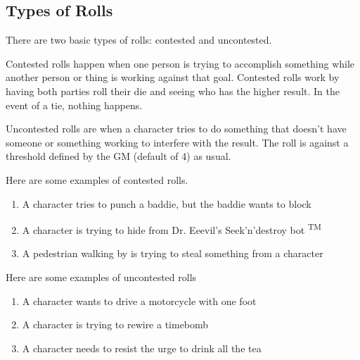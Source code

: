 \begin{flushleft}
\section*{Types of Rolls}

There are two basic types of rolls: contested and uncontested.

Contested rolls happen when one person is trying to accomplish something while
another person or thing is working against that goal. Contested rolls work by
having both parties roll their die and seeing who has the higher result. In
the event of a tie, nothing happens.

Uncontested rolls are when a character tries to do something that doesn't have
someone or something working to interfere with the result. The roll is against
a threshold defined by the GM (default of 4) as usual.

Here are some examples of contested rolls.

\begin{enumerate}

    \item{A character tries to punch a baddie, but the baddie wants to block}
    \item{A character is trying to hide from Dr. Eeevil's Seek'n'destroy bot
          \textsuperscript{TM}}
    \item{A pedestrian walking by is trying to steal something from a
          character}

\end{enumerate}

Here are some examples of uncontested rolls

\begin{enumerate}

    \item{A character wants to drive a motorcycle with one foot}
    \item{A character is trying to rewire a timebomb}
    \item{A character needs to resist the urge to drink all the tea}

\end{enumerate}


\end{flushleft}
